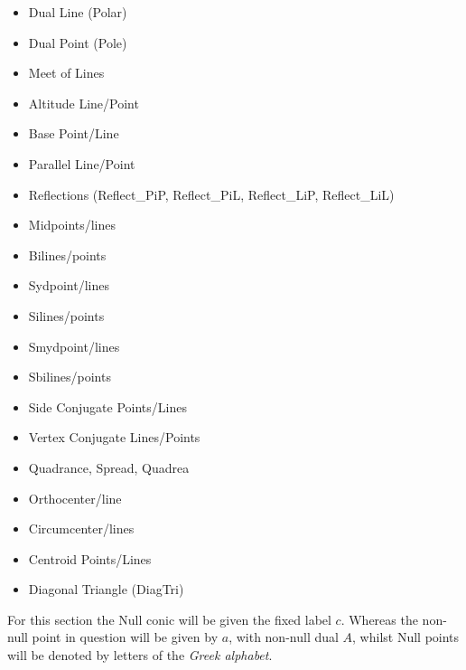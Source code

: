\documentclass{unswthesis}
\begin{document}
\begin{itemize}
\item Dual Line (Polar)

\item Dual Point (Pole)

\item Meet of Lines

\item Altitude Line/Point

\item Base Point/Line

\item Parallel Line/Point

\item Reflections (Reflect\_PiP, Reflect\_PiL, Reflect\_LiP, Reflect\_LiL)

\item Midpoints/lines

\item Bilines/points

\item Sydpoint/lines

\item Silines/points

\item Smydpoint/lines

\item Sbilines/points

\item Side Conjugate Points/Lines

\item Vertex Conjugate Lines/Points

\item Quadrance, Spread, Quadrea

\item Orthocenter/line

\item Circumcenter/lines

\item Centroid Points/Lines

\item Diagonal Triangle (DiagTri)
\end{itemize}

\bigskip 

For this section the Null conic will be given the fixed label $c$. Whereas
the non-null point in question will be given by $a$, with non-null dual $A$,
whilst Null points will be denoted by letters of the \textit{Greek alphabet}.
\end{document}
